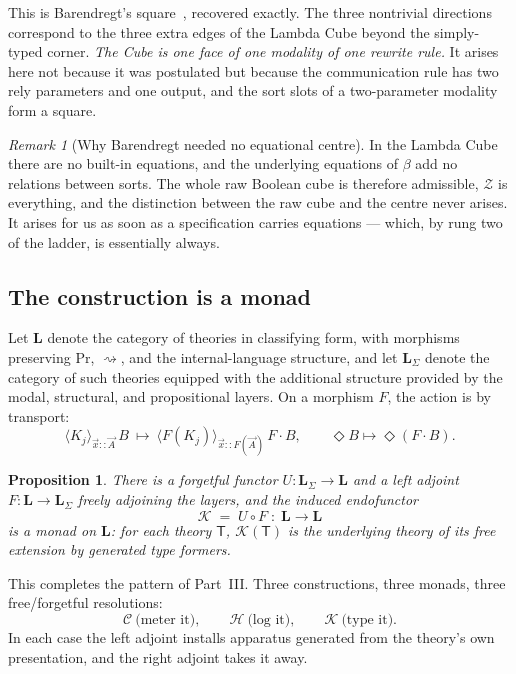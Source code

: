\documentclass[11pt]{article}
\theoremstyle{definition}
\theoremstyle{plain}
\newtheorem{proposition}[definition]{Proposition}
\theoremstyle{remark}
\newtheorem{remark}[definition]{Remark}
\newcommand{\Lcat}{\mathbf{L}}
\renewcommand{\Pr}{\mathrm{Pr}}
\newcommand{\cost}{\mathcal{C}}
\newcommand{\hist}{\mathcal{H}}
\newcommand{\hyp}{\mathcal{K}}
\newcommand{\rsq}{\rightsquigarrow}
\newcommand{\angles}[3]{\langle #1 \rangle_{#2}\,#3}
\newcommand{\Zc}{\mathcal{Z}}
\begin{document}
This is Barendregt's square~\cite{Barendregt1991}, recovered exactly. The three nontrivial
directions correspond to the three extra edges of the Lambda Cube beyond the simply-typed
corner. \emph{The Cube is one face of one modality of one rewrite rule.} It arises here
not because it was postulated but because the communication rule has two rely parameters
and one output, and the sort slots of a two-parameter modality form a square.

\begin{remark}[Why Barendregt needed no equational centre]
In the Lambda Cube there are no built-in equations, and the underlying equations of
$\beta$ add no relations between sorts. The whole raw Boolean cube is therefore
admissible, $\Zc$ is everything, and the distinction between the raw cube and the centre
never arises. It arises for us as soon as a specification carries equations --- which, by
rung two of the ladder, is essentially always.
\end{remark}

\subsection{The construction is a monad}

Let $\Lcat$ denote the category of theories in classifying form, with morphisms preserving
$\Pr$, $\rsq$, and the internal-language structure, and let $\Lcat_\Sigma$ denote the
category of such theories equipped with the additional structure provided by the modal,
structural, and propositional layers. On a morphism $F$, the action is by transport:
\[
  \angles{K_j}{\vec x :: \vec A}{B} \ \longmapsto\
  \angles{F(K_j)}{\vec x :: F(\vec A)}{F \cdot B} ,
  \qquad \Diamond B \longmapsto \Diamond (F \cdot B) .
\]

\begin{proposition}
There is a forgetful functor $U : \Lcat_\Sigma \to \Lcat$ and a left adjoint
$F : \Lcat \to \Lcat_\Sigma$ freely adjoining the layers, and the induced endofunctor
\[
  \hyp \;=\; U \circ F \;:\; \Lcat \longrightarrow \Lcat
\]
is a monad on $\Lcat$: for each theory $\mathsf{T}$, $\hyp(\mathsf{T})$ is the underlying
theory of its free extension by generated type formers.
\end{proposition}

This completes the pattern of Part~III. Three constructions, three monads, three
free/forgetful resolutions:
\[
  \cost \ \text{(meter it)}, \qquad
  \hist \ \text{(log it)}, \qquad
  \hyp  \ \text{(type it)} .
\]
In each case the left adjoint installs apparatus generated from the theory's own
presentation, and the right adjoint takes it away.
\end{document}
